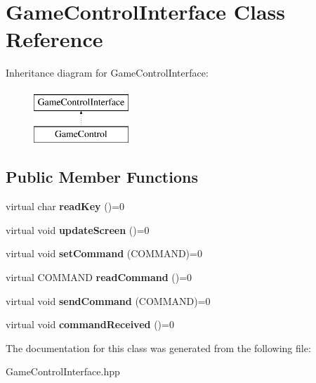 \hypertarget{class_game_control_interface}{}\section{Game\+Control\+Interface Class Reference}
\label{class_game_control_interface}
Inheritance diagram for Game\+Control\+Interface\+:\begin{figure}[H]
\begin{center}
\leavevmode
\includegraphics[height=2.000000cm]{class_game_control_interface}
\end{center}
\end{figure}
\subsection*{Public Member Functions}
\begin{DoxyCompactItemize}
\item 
virtual char {\bfseries read\+Key} ()=0\hypertarget{class_game_control_interface_ad4e7d9fbda85ecac54f7dae9f8b71a1d}{}\label{class_game_control_interface_ad4e7d9fbda85ecac54f7dae9f8b71a1d}

\item 
virtual void {\bfseries update\+Screen} ()=0\hypertarget{class_game_control_interface_a8ed7d203ab84871801b51b27da6c0459}{}\label{class_game_control_interface_a8ed7d203ab84871801b51b27da6c0459}

\item 
virtual void {\bfseries set\+Command} (C\+O\+M\+M\+A\+ND)=0\hypertarget{class_game_control_interface_a721c209eee504ff9002ac9cfefc89083}{}\label{class_game_control_interface_a721c209eee504ff9002ac9cfefc89083}

\item 
virtual C\+O\+M\+M\+A\+ND {\bfseries read\+Command} ()=0\hypertarget{class_game_control_interface_a80524b79b9791b7fa77a157b18606c61}{}\label{class_game_control_interface_a80524b79b9791b7fa77a157b18606c61}

\item 
virtual void {\bfseries send\+Command} (C\+O\+M\+M\+A\+ND)=0\hypertarget{class_game_control_interface_a700e8cfa7c588470a6be1e5870af3da7}{}\label{class_game_control_interface_a700e8cfa7c588470a6be1e5870af3da7}

\item 
virtual void {\bfseries command\+Received} ()=0\hypertarget{class_game_control_interface_aeb025f479c075181075279d34176a2cf}{}\label{class_game_control_interface_aeb025f479c075181075279d34176a2cf}

\end{DoxyCompactItemize}


The documentation for this class was generated from the following file\+:\begin{DoxyCompactItemize}
\item 
Game\+Control\+Interface.\+hpp\end{DoxyCompactItemize}
